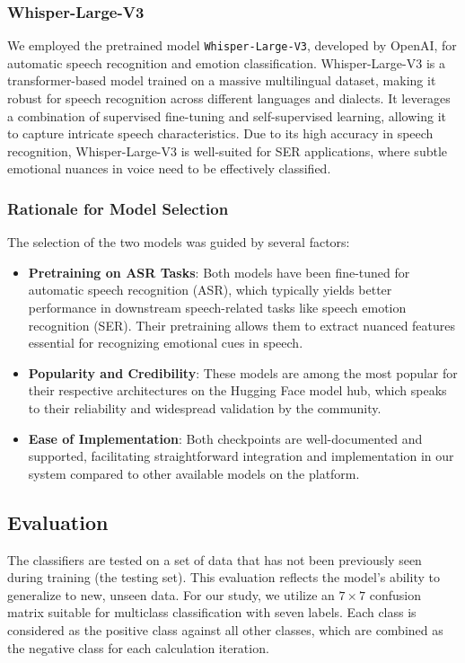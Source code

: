 \documentclass[a4paper,12pt]{article}
\begin{document}
\subsubsection{Whisper-Large-V3}
We employed the pretrained model \texttt{Whisper-Large-V3}, developed by OpenAI, for automatic speech recognition and emotion classification. Whisper-Large-V3 is a transformer-based model trained on a massive multilingual dataset, making it robust for speech recognition across different languages and dialects. It leverages a combination of supervised fine-tuning and self-supervised learning, allowing it to capture intricate speech characteristics. Due to its high accuracy in speech recognition, Whisper-Large-V3 is well-suited for SER applications, where subtle emotional nuances in voice need to be effectively classified.

\subsubsection{Rationale for Model Selection}
The selection of the two models was guided by several factors:
\begin{itemize}
    \item \textbf{Pretraining on ASR Tasks}: Both models have been fine-tuned for automatic speech recognition (ASR), which typically yields better performance in downstream speech-related tasks like speech emotion recognition (SER). Their pretraining allows them to extract nuanced features essential for recognizing emotional cues in speech.
    \item \textbf{Popularity and Credibility}: These models are among the most popular for their respective architectures on the Hugging Face model hub, which speaks to their reliability and widespread validation by the community.
    \item \textbf{Ease of Implementation}: Both checkpoints are well-documented and supported, facilitating straightforward integration and implementation in our system compared to other available models on the platform.
\end{itemize}

\subsection{Evaluation}
The classifiers are tested on a set of data that has not been previously seen during training (the testing set). This evaluation reflects the model’s ability to generalize to new, unseen data. For our study, we utilize an $7 \times 7$ confusion matrix suitable for multiclass classification with seven labels. Each class is considered as the positive class against all other classes, which are combined as the negative class for each calculation iteration.
\end{document}
